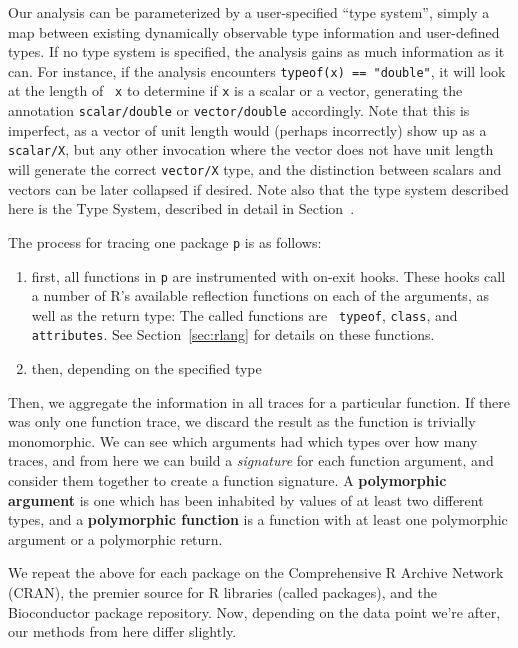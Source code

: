 \documentclass[acmsmall,10pt,review,anonymous]{acmart}\settopmatter{printfolios=true,printccs=false,printacmref=false}
\begin{document}
 Our analysis can be parameterized by a user-specified ``type
system'', simply a map between existing dynamically observable type
information and user-defined types.  If no type system is specified, the
analysis gains as much information as it can.  For instance, if the analysis
encounters {\tt typeof(x) == "double"}, it will look at the length of {\tt
  x} to determine if {\tt x} is a scalar or a vector, generating the
annotation {\tt scalar/double} or {\tt vector/double} accordingly.  Note
that this is imperfect, as a vector of unit length would (perhaps
incorrectly) show up as a {\tt scalar/X}, but any other invocation where the
vector does not have unit length will generate the correct {\tt vector/X}
type, and the distinction between scalars and vectors can be later collapsed
if desired.  Note also that the type system described here is the
 Type System, described in detail in Section~.

The process for tracing one package {\tt p} is as follows:

\begin{enumerate}
\item first, all functions in {\tt p} are instrumented with on-exit hooks.
  These hooks call a number of R's available reflection functions on each of
  the arguments, as well as the return type: The called functions are {\tt
    typeof}, {\tt class}, and {\tt attributes}.  See Section~\ref{sec:rlang}
  for details on these functions.
	
\item then, depending on the specified type 
\end{enumerate}

Then, we aggregate the information in all traces for a particular function.
If there was only one function trace, we discard the result as the function
is trivially monomorphic.  We can see which arguments had which types over
how many traces, and from here we can build a \textit{signature} for each
function argument, and consider them together to create a function
signature.  A \textbf{polymorphic argument} is one which has been inhabited
by values of at least two different types, and a \textbf{polymorphic
  function} is a function with at least one polymorphic argument or a
polymorphic return.

We repeat the above for each package on the Comprehensive R Archive Network
(CRAN), the premier source for R libraries (called packages), and the
Bioconductor package repository.  Now, depending on the data point we're
after, our methods from here differ slightly.
\end{document}
